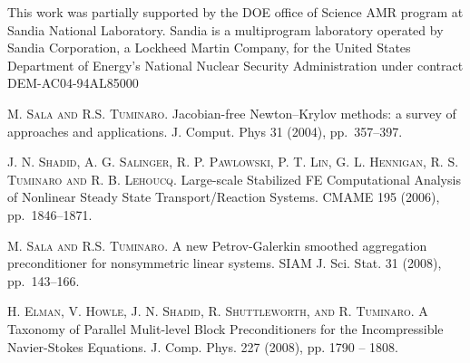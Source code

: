 This work was partially supported by  the DOE office of Science AMR program at Sandia National Laboratory. Sandia is a multiprogram laboratory operated by Sandia Corporation, a Lockheed Martin Company, for the United States Department of Energy's National Nuclear Security Administration under contract DEM-AC04-94AL85000


\begin{thebibliography}{10}
\textsc{M. Sala and R.S. Tuminaro}. {Jacobian-free {N}ewton--{K}rylov methods: a survey of approaches and applications}. J. Comput. Phys 31 (2004), pp.~357--397.

\textsc{J. N. Shadid, A. G. Salinger, R. P. Pawlowski, P. T. Lin, G. L. Hennigan, R. S. Tuminaro and R. B. Lehoucq}. {Large-scale Stabilized FE Computational Analysis of Nonlinear Steady State Transport/Reaction Systems}. CMAME 195 (2006), pp.~1846--1871.

\textsc{M. Sala and R.S. Tuminaro}. {A new Petrov-Galerkin smoothed aggregation preconditioner for nonsymmetric linear systems}. SIAM J. Sci. Stat. 31 (2008), pp.~143--166.

\textsc{H. Elman, V. Howle, J. N.  Shadid, R. Shuttleworth, and R. Tuminaro}. {A Taxonomy of Parallel Mulit-level Block Preconditioners for the Incompressible Navier-Stokes Equations}. J. Comp. Phys. 227 (2008), pp. 1790 -- 1808.
\end{thebibliography}